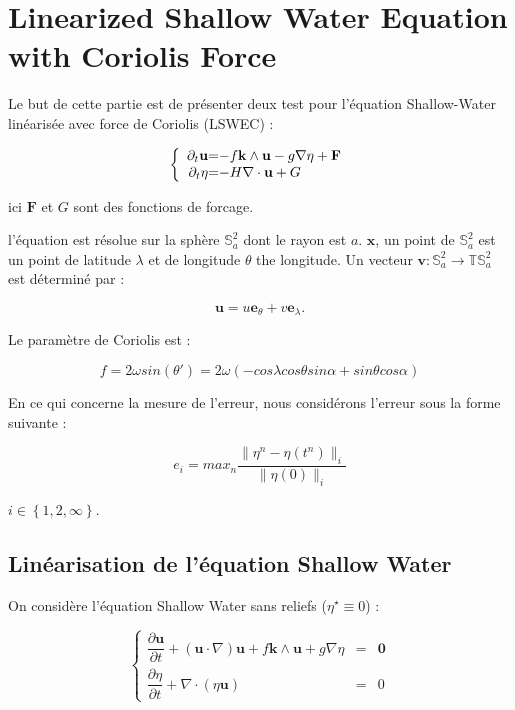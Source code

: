 \chapter{Linearized Shallow Water Equation with Coriolis Force}

Le but de cette partie est de présenter deux test pour l'équation Shallow-Water linéarisée avec force de Coriolis (LSWEC) :

\begin{equation}
\label{LSWEC}
\left\lbrace
\begin{array}{r @{=} l}
\partial_t \mathbf{u} & -f \mathbf{k} \wedge \mathbf{u} - g \nabla \eta + \mathbf{F} \\
\partial_t \eta & -H \nabla \cdot \mathbf{u} + G
\end{array}
\right.
\end{equation}

ici $\mathbf{F}$ et $G$ sont des fonctions de forcage.

l'équation est résolue sur la sphère $\mathbb{S}_a^2$ dont le rayon est $a$. $\mathbf{x}$, un point de $\mathbb{S}_a^2$ est un point de latitude $\lambda$ et de longitude $\theta$ the longitude. Un vecteur $\mathbf{v} : \mathbb{S}_a^2 \rightarrow \mathbb{T}\mathbb{S}_a^2$ est déterminé par :

$$\mathbf{u} = u \mathbf{e}_{\theta} + v \mathbf{e}_{\lambda}.$$ 

Le paramètre de Coriolis est :

\begin{equation}
f=2 \omega sin ( \theta' ) = 2 \omega \left( -cos \lambda cos \theta sin \alpha + sin \theta cos \alpha \right)
\label{coriolis_parameter}
\end{equation}

En ce qui concerne la mesure de l'erreur, nous considérons l'erreur sous la forme suivante :

$$e_{i} = max_n \dfrac{\| \eta^n - \eta(t^n) \|_{i}}{\| \eta(0) \|_{i}}$$

$i \in \left\lbrace 1, 2, \infty \right\rbrace$.

\section{Linéarisation de l'équation Shallow Water}

On considère l'équation Shallow Water sans reliefs ($\eta^{\star} \equiv 0$) :

\begin{equation}
\label{eq:SWE_without relief}
\left\lbrace
\begin{array}{rcl}
\dfrac{\partial \mathbf{u}}{\partial t} + \left( \mathbf{u} \cdot \nabla \right) \mathbf{u} + f \mathbf{k} \wedge \mathbf{u} + g \nabla \eta & = & \mathbf{0} \\
\dfrac{\partial \eta}{\partial t} + \nabla \cdot \left( \eta \mathbf{u} \right) & = & 0
\end{array}
\right.
\end{equation}

